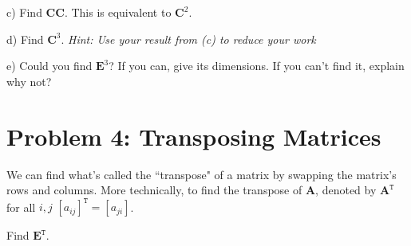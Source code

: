 \documentclass{article}
\begin{document}
\begin{flushleft}
\newpage

c) Find $\textbf{CC}$.  This is equivalent to $\textbf{C}^2$.

\vspace{1.5in}

d) Find $\textbf{C}^3$. \textit{Hint: Use your result from (c) to reduce your work}

\vspace{1.5in}

e) Could you find $\textbf{E}^3$?  If you can, give its dimensions.  If you can't find it, explain why not?

\vspace{0.75in}

\section*{Problem 4: Transposing Matrices}

We can find what's called the ``transpose" of a matrix by swapping the matrix's rows and columns.  More technically, to find the transpose of \textbf{A}, denoted by $\textbf{A}^\texttt{T}$ for all $i,j$ $[a_{ij}]^\texttt{T}=[a_{ji}]$.

\vspace{0.2in}

Find $\textbf{E}^\texttt{T}$.

\end{flushleft}
\end{document}
